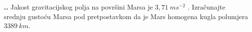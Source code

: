 

\noindent 
\textbf{
\thecjelina.\thezadatak.}
Jakost gravitacijskog polja na površini Marsa je $3,71\ ms^{−2}$ . Izračunajte srednju gustoću
Marsa pod pretpostavkom da je Mars homogena kugla polumjera $3389\ km$.

